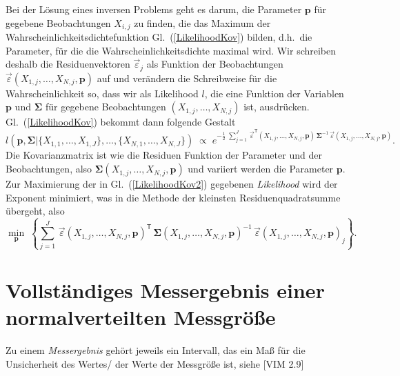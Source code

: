 Bei der Lösung eines inversen Problems geht es darum, die Parameter $\mathbf{p}$
für gegebene Beobachtungen $X_{i,j}$ zu finden, die das Maximum der Wahrscheinlichkeitsdichtefunktion
Gl.~(\ref{LikelihoodKov}) bilden, d.h.\ die Parameter, für die die Wahrscheinlichkeitsdichte
maximal wird. Wir schreiben deshalb die Residuenvektoren $\vec \varepsilon_j$ als Funktion
der Beobachtungen $\vec \varepsilon(X_{1,j},\dots,X_{N,j},\mathbf{p})$ auf und verändern die Schreibweise
für die Wahrscheinlichkeit so, dass wir als Likelihood $l$, die eine Funktion der
Variablen $\mathbf{p}$ und $\boldsymbol{\Sigma}$ für gegebene Beobachtungen $(X_{1,j},\dots,X_{N,j})$ ist,
ausdrücken. Gl.~(\ref{LikelihoodKov}) bekommt dann folgende Gestalt
\begin{equation}
l(\mathbf{p}, \boldsymbol{\Sigma} | \{X_{1,1}, \dots, X_{1,J}\}, \dots, \{X_{N,1}, \dots, X_{N,J}\} ) \; \propto \;
e^{-\frac{1}{2} \; \sum\limits_{j=1}^J \, \vec \varepsilon^\mathsf{T}(X_{1,j},\dots,X_{N,j},\mathbf{p}) \,
 \boldsymbol{\Sigma}^{-1} \, \vec \varepsilon(X_{1,j},\dots,X_{N,j},\mathbf{p}) } .
\label{LikelihoodKov2}
\end{equation}
Die Kovarianzmatrix ist wie die Residuen Funktion der Parameter und der Beobachtungen,
also $\boldsymbol{\Sigma}(X_{1,j},\dots,X_{N,j},\mathbf{p})$ und
variiert werden die Parameter $\mathbf{p}$.
Zur Maximierung der in Gl.~(\ref{LikelihoodKov2}) gegebenen
\textsl{Likelihood} wird der Exponent minimiert, was in die Methode der kleinsten Residuenquadratsumme
übergeht, also
\begin{equation}
\min_{\mathbf{p}} \; \left\{
 \sum\limits_{j=1}^J \, \vec \varepsilon(X_{1,j},\dots,X_{N,j},\mathbf{p})^\mathsf{T} \,
\boldsymbol{\Sigma}(X_{1,j},\dots,X_{N,j},\mathbf{p})^{-1} \, \vec \varepsilon(X_{1,j},\dots,X_{N,j},\mathbf{p})_j \right\} .
\end{equation}

\section{Vollständiges Messergebnis einer normalverteilten Messgröße}

Zu einem \textsl{Messergebnis} gehört jeweils ein Intervall, das ein Maß für die Unsicherheit
des Wertes/ der Werte der Messgröße ist, siehe [VIM 2.9]


